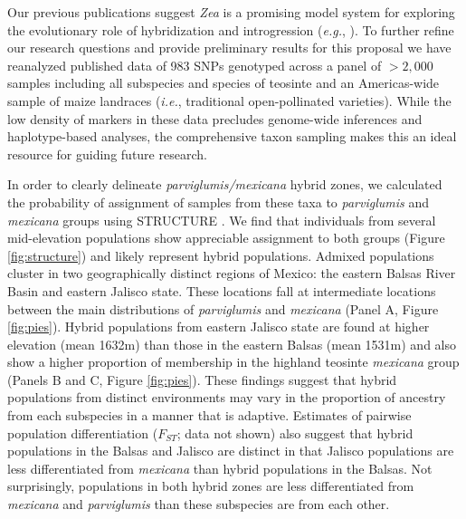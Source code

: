 

Our previous publications suggest \emph{Zea} is a promising model system for exploring the evolutionary role of hybridization and introgression (\emph{e.g.},  \citealt{Ross-Ibarra2009a, vanheerwaarden2011a, Hufford2013, Pyhajarvi2013}).  
To further refine our research questions and provide preliminary results for this proposal we have reanalyzed published data \citep{Fang2012} of 983 SNPs genotyped across a panel of $>2,000$ samples including all subspecies and species of teosinte and an Americas-wide sample of maize landraces (\emph{i.e.}, traditional open-pollinated varieties).
While the low density of markers in these data precludes genome-wide inferences and haplotype-based analyses, the comprehensive taxon sampling makes this an ideal resource for guiding future research.

In order to clearly delineate \emph{parviglumis/mexicana} hybrid zones, we calculated the probability of assignment of samples from these taxa to \emph{parviglumis} and \emph{mexicana} groups using STRUCTURE \citep{Pritchard2000}.  We find that individuals from several mid-elevation populations show appreciable assignment to both groups (Figure \ref{fig:structure}) and likely represent hybrid populations.  
Admixed populations cluster in two geographically distinct regions of Mexico: the eastern Balsas River Basin and eastern Jalisco state.
These locations fall at intermediate locations between the main distributions of \emph{parviglumis} and \emph{mexicana} (Panel A, Figure \ref{fig:pies}).
Hybrid populations from eastern Jalisco state are found at higher elevation (mean 1632m) than those in the eastern Balsas (mean 1531m) and also show a higher proportion of membership in the highland teosinte \emph{mexicana} group (Panels B and C, Figure \ref{fig:pies}).
These findings suggest that hybrid populations from distinct environments may vary in the proportion of ancestry from each subspecies in a manner that is adaptive.
Estimates of pairwise population differentiation ($F_{ST}$; data not shown) also suggest that hybrid populations in the Balsas and Jalisco are distinct in that Jalisco populations are less differentiated from \emph{mexicana} than hybrid populations in the Balsas.  Not surprisingly, populations in both hybrid zones are less differentiated from \emph{mexicana} and \emph{parviglumis} than these subspecies are from each other. 

